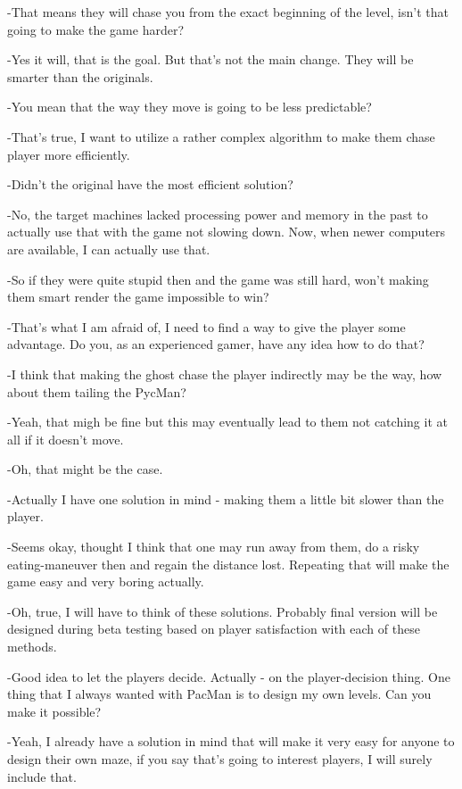 \documentclass[11pt,a4paper]{report}
\begin{document}
			-That means they will chase you from the exact beginning of the level, isn't that going to make the game harder?
			
			-Yes it will, that is the goal. But that's not the main change. They will be smarter than the originals.
			
			-You mean that the way they move is going to be less predictable?
			
			-That's true, I want to utilize a rather complex algorithm to make them chase player more efficiently.
			
			-Didn't the original have the most efficient solution?
			
			-No, the target machines lacked processing power and memory in the past to actually use that with the game not slowing down. Now, when newer computers are available, I can actually use that.
			
			-So if they were quite stupid then and the game was still hard, won't making them smart render the game impossible to win?
			
			-That's what I am afraid of, I need to find a way to give the player some advantage. Do you, as an experienced gamer, have any idea how to do that?
			
			-I think that making the ghost chase the player indirectly may be the way, how about them tailing the PycMan?
			
			-Yeah, that migh be fine but this may eventually lead to them not catching it at all if it doesn't move.
			
			-Oh, that might be the case.
			
			-Actually I have one solution in mind - making them a little bit slower than the player.
			
			-Seems okay, thought I think that one may run away from them, do a risky eating-maneuver then and regain the distance lost. Repeating that will make the game easy and very boring actually.
			
			-Oh, true, I will have to think of these solutions. Probably final version will be designed during beta testing based on player satisfaction with each of these methods.
			
			-Good idea to let the players decide. Actually - on the player-decision thing. One thing that I always wanted with PacMan is to design my own levels. Can you make it possible?
			
			-Yeah, I already have a solution in mind that will make it very easy for anyone to design their own maze, if you say that's going to interest players, I will surely include that.
			
\end{document}
